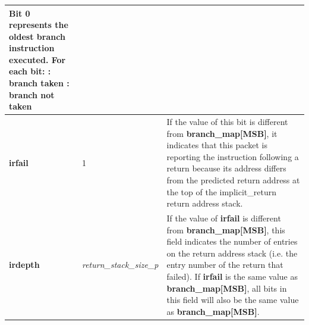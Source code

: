 \begin{table}[htp]
\begin{tabulary}{\textwidth}{|l|p{35mm}|p{90mm}|}
    Bit 0 represents the oldest branch instruction executed.   For each bit: : branch taken : branch not taken \\
    \hline
    \textbf{irfail}	& 1 & 
                If the value of this bit is different from \textbf{branch\_map[MSB]}, it indicates that this
                packet is reporting the instruction following a return because its address differs from 
                the predicted return address at the top of the implicit\_return return address stack.\\
    \hline
    \textbf{irdepth}	& \textit {return\_stack\_size\_p} & 
                If the value of \textbf{irfail} is different from \textbf{branch\_map[MSB]}, this field indicates 
                the number of entries on the return address stack (i.e. the entry number of the return that
                failed).  If \textbf{irfail} is the same value as \textbf{branch\_map[MSB]}, all bits in this field 
                will also be the same value as \textbf{branch\_map[MSB]}. \\
    \hline
  \end{tabulary}
\end{table}

